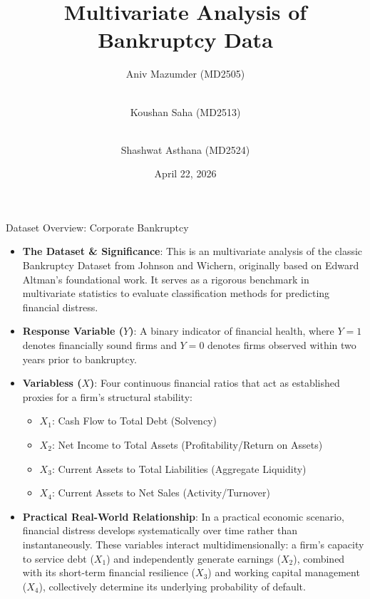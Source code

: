\documentclass[8pt, aspectratio=169]{beamer}
\title[Multivariate Bankruptcy Analysis]{Multivariate Analysis of Bankruptcy Data}
\author[Aniv, Koushan, Shashwat]{
    Aniv Mazumder (MD2505) \and \\
    Koushan Saha (MD2513) \and \\
    Shashwat Asthana (MD2524)
}
\institute[ISI Delhi]{
    Under the guidance of Dr. Swagata Nandi \\
    Course: Multivariate Analysis \\
    Indian Statistical Institute, Delhi
}
\date{April 22, 2026}
\begin{document}
\begin{frame}
    \titlepage
\end{frame}

\begin{frame}{Dataset Overview: Corporate Bankruptcy}
    \begin{itemize}
        \item \textbf{The Dataset \& Significance}: This is an multivariate analysis of the classic Bankruptcy Dataset from Johnson and Wichern, originally based on Edward Altman's foundational work. It serves as a rigorous benchmark in multivariate statistics to evaluate classification methods for predicting financial distress.
        \item \textbf{Response Variable ($Y$)}: A binary indicator of financial health, where $Y=1$ denotes financially sound firms and $Y=0$ denotes firms observed within two years prior to bankruptcy.
        \item \textbf{Variabless ($X$)}: Four continuous financial ratios that act as established proxies for a firm's structural stability:
        \begin{itemize}
            \item $X_1$: Cash Flow to Total Debt (Solvency)
            \item $X_2$: Net Income to Total Assets (Profitability/Return on Assets) 
            \item $X_3$: Current Assets to Total Liabilities (Aggregate Liquidity)
            \item $X_4$: Current Assets to Net Sales (Activity/Turnover)
        \end{itemize}
        \item \textbf{Practical Real-World Relationship}: In a practical economic scenario, financial distress develops systematically over time rather than instantaneously. These variables interact multidimensionally: a firm's capacity to service debt ($X_1$) and independently generate earnings ($X_2$), combined with its short-term financial resilience ($X_3$) and working capital management ($X_4$), collectively determine its underlying probability of default.
    \end{itemize}
\end{frame}
\end{document}
